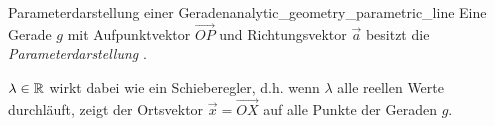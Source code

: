 \label{subsec:analytic_geometry_parametric_line_equations}

\begin{DefinitionBox}{Parameterdarstellung einer Geraden}{analytic_geometry_parametric_line}
  Eine Gerade $g$ mit Aufpunktvektor $\overrightarrow{OP}$ und Richtungsvektor
  $\vec a$ besitzt die
  \emph{Parameterdarstellung} .

  \noindent
  \begin{minipage}[t]{0.54\linewidth}
    \vspace{0pt}
    \centering
  \end{minipage}\hfill
  \begin{minipage}[t]{0.42\linewidth}
    \vspace{0pt}
    \centering
    \begingroup
      \def\LineUnit{0.75}
      \def\LineSupportX{3}
      \def\LineSupportY{3}
      \def\LineDirectionX{1}
      \def\LineDirectionY{-1}
      \def\LineLambdaMin{-3.75}
      \def\LineLambdaMax{3.75}
    \endgroup
  \end{minipage}

  $\lambda\in\mathbb{R}$ wirkt dabei wie ein Schieberegler, d.h. wenn
  $\lambda$ alle reellen Werte durchläuft, zeigt der Ortsvektor
  $\vec x=\overrightarrow{OX}$ auf alle Punkte der Geraden $g$.
\end{DefinitionBox}

